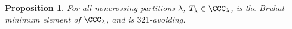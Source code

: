\documentclass[submission]{FPSAC2024}
\newtheorem{prop}[equation]{Proposition}
\theoremstyle{definition}
\theoremstyle{remark}
\numberwithin{equation}{section}
\renewcommand{\setminus}{-}
\newcommand{\EP}{E_{pos}}
\newcommand{\EV}{E_{val}}
\begin{document}
\begin{prop}
\label{prop:321avoid}
For all noncrossing partitions $\lambda$, $T_{\lambda} \in \CCC_{\lambda}$, is the Bruhat-minimum element of $\CCC_{\lambda}$, and is $321$-avoiding.
\end{prop}
%
%
%
%
\end{document}
